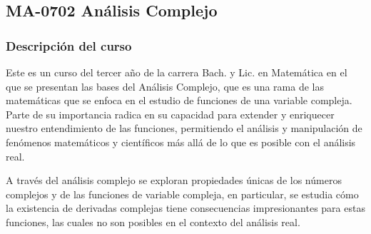 \newpage
\subsection*{MA-0702 Análisis Complejo}

\hypertarget{MA0702}{}
\begin{refsection}
\begin{table}[H]
\end{table}



\subsubsection*{Descripción del curso}

Este es un curso del tercer año de la carrera Bach. y Lic. en Matemática en el que se presentan las bases del Análisis Complejo, que es una rama de las matemáticas que se enfoca en el estudio de funciones de una variable compleja. Parte de su importancia radica en su capacidad para extender y enriquecer nuestro entendimiento de las funciones, permitiendo el análisis y manipulación de fenómenos matemáticos y científicos más allá de lo que es posible con el análisis real. 

A través del análisis complejo se exploran propiedades únicas de los números complejos y de las funciones de variable compleja, en particular, se estudia cómo la existencia de derivadas complejas tiene consecuencias impresionantes para estas funciones, las cuales no son posibles en el contexto del análisis real.


\end{refsection}
